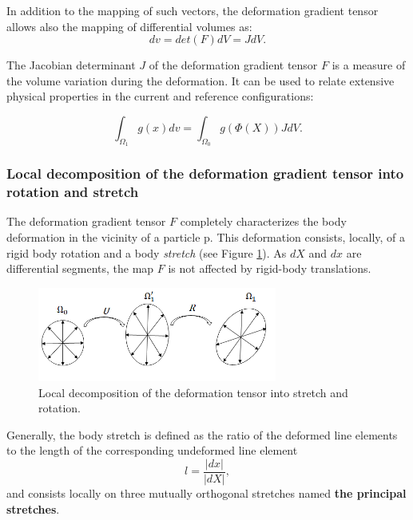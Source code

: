 In addition to the mapping of such vectors, the deformation gradient tensor allows also the mapping of differential volumes as:
\begin{equation}
dv = det(F)dV = JdV.
\label{JacobianRelation}
\end{equation}

The Jacobian determinant $J$ of the deformation gradient tensor $F$ is a measure of the volume variation during the deformation. It can be used to relate extensive physical properties in the current and reference configurations:

\begin{equation}
\int_{\Omega_1}g(x)dv = \int_{\Omega_0}g(\Phi(X))JdV.
\end{equation}

\subsubsection*{Local decomposition of the deformation gradient tensor into rotation and stretch}\label{deformationgradienttensor}
The deformation gradient tensor $F$ completely characterizes
the body deformation in the vicinity of a particle p. This deformation consists, locally, of a rigid body rotation and a body \textit{stretch} (see Figure \ref{deformationGradientDecom}). As $dX$ and $dx$ are differential segments, the map $F$ is not affected by rigid-body translations.  

\begin{figure}
\centering
\includegraphics[width=0.7\textwidth,keepaspectratio]{figures/deformationTensorDecomposition.png} 
\caption[]{Local decomposition of the deformation tensor into stretch and rotation.  }
\label{deformationGradientDecom}
\end{figure}

Generally, the body stretch is defined as the ratio of the deformed line elements to the length of the corresponding undeformed line element 
\begin{equation}
l = \frac{\vert dx \vert}{\vert dX \vert},
\end{equation} 
and consists locally on three mutually orthogonal stretches named \textbf{the principal stretches}.

